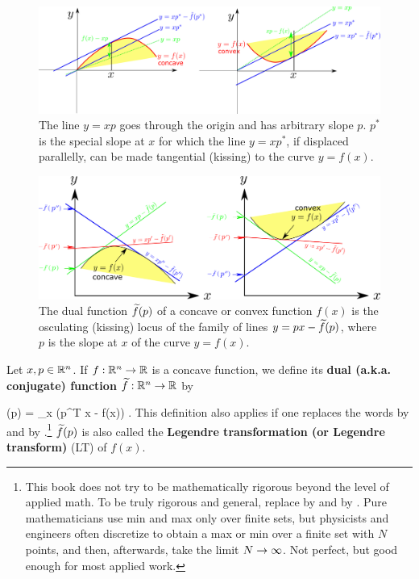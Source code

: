 \begin{figure}[h!]
\centering
\includegraphics[width=6in]
{conventions/dual-fun-detail.png}
\caption{The line
$y=xp$ goes through the
origin and has arbitrary slope 
$p$. $p^*$ is 
the special slope 
at $x$
for which the line
$y=xp^*$,
if
displaced parallelly,
can be made tangential (kissing)
to
the curve $y=f(x)$.}
\label{fig-dual-fun-detail}
\end{figure}

\begin{figure}[h!]
\centering
\includegraphics[width=6in]
{conventions/dual-fun.png}
\caption{The dual
function ${\widetilde{f}}(p)$ of a concave or convex function
$f(x)$
is the osculating (kissing)
locus of the 
family
of lines $y=px - {\widetilde{f}}(p)$,
where $p$
is the slope at $x$ 
of the curve $y=f(x)$.}
\label{fig-dual-fun}
\end{figure}

Let $x,p\in{ \mathbb{R}}^n$.
If $f:{ \mathbb{R}}^n\rightarrow { \mathbb{R}}$ is a concave function, we
define its {\bf dual (a.k.a.
conjugate) function} 
${\widetilde{f}}:{ \mathbb{R}}^n\rightarrow { \mathbb{R}}$ by

\beq
{}(p) = \min_x (p^T x - f(x))
\label{eq-Fp-def}
\;.
\eeq
This definition also applies if
one replaces the words 
by  and
 by .\footnote{This
book does not try to be
mathematically rigorous
beyond the level
of applied math. To be truly
rigorous and general,
replace  by 
and  by .
Pure mathematicians use
min and max 
only over finite sets,
but physicists and engineers 
often discretize to obtain 
a max or min  over a finite
set with $N$ points,
and then, afterwards,
take the limit $N\rightarrow\infty$.
Not perfect, but good enough
for most applied work. }
${\widetilde{f}}(p)$
is also called the 
{\bf Legendre transformation (or
Legendre transform)} (LT)
of $f(x)$.


